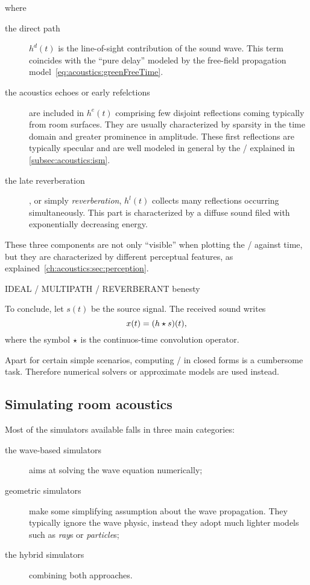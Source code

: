 where
\begin{description}
    \item[the direct path] $h^d(t)$ is the line-of-sight contribution of the sound wave.
    This term coincides with the ``pure delay'' modeled by the free-field propagation model~\eqref{eq:acoustics:greenFreeTime}.
    \item[the acoustics echoes or early refelctions] are included in $h^e(t)$ comprising few disjoint reflections coming typically from room surfaces.
    They are usually characterized by sparsity in the time domain and greater prominence in amplitude.
    These first reflections are typically specular and are well modeled in general by the \ISMdef/ explained in \cref{subsec:acoustics:ism}.
    \item[the late reverberation], or simply \textit{reverberation}, $h^l(t)$ collects many reflections occurring simultaneously.
    This part is characterized by a diffuse sound filed with exponentially decreasing energy.
\end{description}
These three components are not only ``visible'' when plotting the \RIR/ against time,
but they are characterized by different perceptual features, as explained~\cref{ch:acoustics:sec:perception}.

IDEAL \vs/ MULTIPATH \vs/ REVERBERANT benesty
\mynewline



To conclude, let $s(t)$ be the source signal. The received sound writes
\begin{equation}
    x(t) = (h \star s)(t)
    ,
\end{equation}
where the symbol $\star$ is the continuos-time convolution operator.

Apart for certain simple scenarios, computing \RIRs/ in closed forms is a cumbersome task.
Therefore numerical solvers or approximate models are used instead.

\subsection{Simulating room acoustics}\label{sec:acoustics:simulators}
Most of the simulators available falls in three main categories:
\begin{description}
    \item[the wave-based simulators] aims at solving the wave equation numerically;
    \item[geometric simulators] make some simplifying assumption about the wave propagation.
    They typically ignore the wave physic, instead they adopt much lighter models such as \textit{ray}s or \textit{particle}s;
    \item[the hybrid simulators] combining both approaches.
\end{description}

